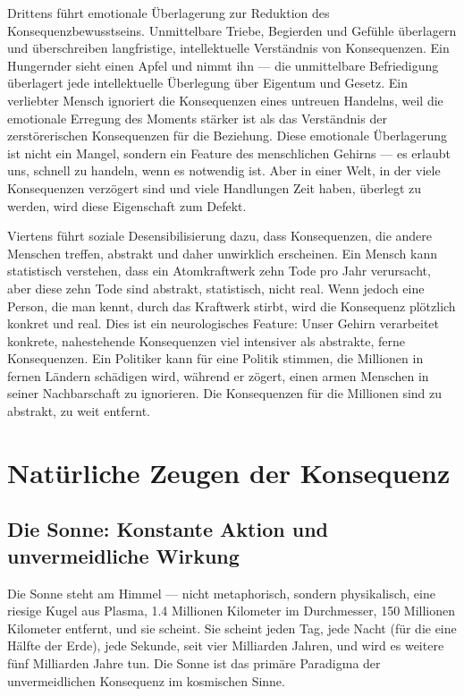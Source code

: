 \documentclass[12pt,a4paper]{article}
\begin{document}
Drittens führt emotionale Überlagerung zur Reduktion des Konsequenzbewusstseins. Unmittelbare Triebe, Begierden und Gefühle überlagern und überschreiben langfristige, intellektuelle Verständnis von Konsequenzen. Ein Hungernder sieht einen Apfel und nimmt ihn — die unmittelbare Befriedigung überlagert jede intellektuelle Überlegung über Eigentum und Gesetz. Ein verliebter Mensch ignoriert die Konsequenzen eines untreuen Handelns, weil die emotionale Erregung des Moments stärker ist als das Verständnis der zerstörerischen Konsequenzen für die Beziehung. Diese emotionale Überlagerung ist nicht ein Mangel, sondern ein Feature des menschlichen Gehirns — es erlaubt uns, schnell zu handeln, wenn es notwendig ist. Aber in einer Welt, in der viele Konsequenzen verzögert sind und viele Handlungen Zeit haben, überlegt zu werden, wird diese Eigenschaft zum Defekt.

Viertens führt soziale Desensibilisierung dazu, dass Konsequenzen, die andere Menschen treffen, abstrakt und daher unwirklich erscheinen. Ein Mensch kann statistisch verstehen, dass ein Atomkraftwerk zehn Tode pro Jahr verursacht, aber diese zehn Tode sind abstrakt, statistisch, nicht real. Wenn jedoch eine Person, die man kennt, durch das Kraftwerk stirbt, wird die Konsequenz plötzlich konkret und real. Dies ist ein neurologisches Feature: Unser Gehirn verarbeitet konkrete, nahestehende Konsequenzen viel intensiver als abstrakte, ferne Konsequenzen. Ein Politiker kann für eine Politik stimmen, die Millionen in fernen Ländern schädigen wird, während er zögert, einen armen Menschen in seiner Nachbarschaft zu ignorieren. Die Konsequenzen für die Millionen sind zu abstrakt, zu weit entfernt.

\section{Natürliche Zeugen der Konsequenz}

\subsection{Die Sonne: Konstante Aktion und unvermeidliche Wirkung}

Die Sonne steht am Himmel — nicht metaphorisch, sondern physikalisch, eine riesige Kugel aus Plasma, 1.4 Millionen Kilometer im Durchmesser, 150 Millionen Kilometer entfernt, und sie scheint. Sie scheint jeden Tag, jede Nacht (für die eine Hälfte der Erde), jede Sekunde, seit vier Milliarden Jahren, und wird es weitere fünf Milliarden Jahre tun. Die Sonne ist das primäre Paradigma der unvermeidlichen Konsequenz im kosmischen Sinne.
\end{document}
